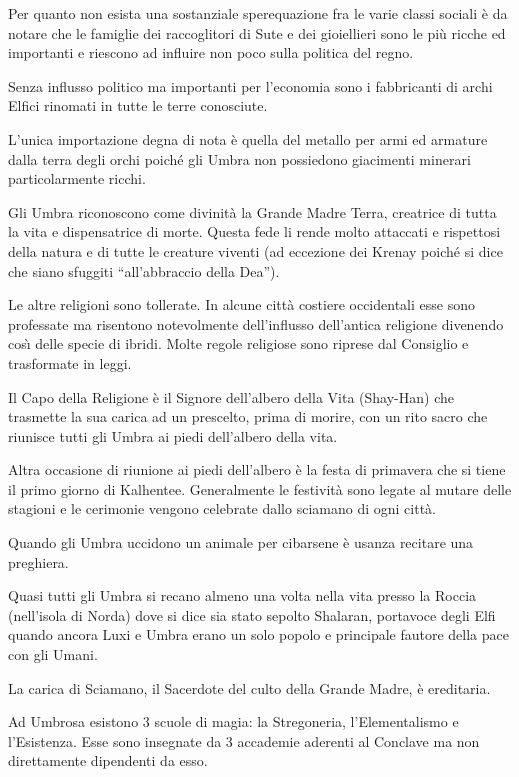 Per quanto non esista una sostanziale sperequazione fra le varie
classi sociali \`e da notare che le famiglie dei raccoglitori di Sute
e dei gioiellieri sono le pi\`u ricche ed importanti e riescono ad
influire non poco sulla politica del regno.

Senza influsso politico ma importanti per l'economia sono i
fabbricanti di archi Elfici rinomati in tutte le terre conosciute.

L'unica importazione degna di nota \`e quella del metallo per armi ed
armature dalla terra degli orchi poich\'e gli Umbra non possiedono
giacimenti minerari particolarmente ricchi.

\Religione Gli Umbra riconoscono come divinit\`a la Grande Madre
Terra, creatrice di tutta la vita e dispensatrice di morte. Questa
fede li rende molto attaccati e rispettosi della natura e di tutte le
creature viventi (ad eccezione dei Krenay poich\'e si dice che siano
sfuggiti ``all'abbraccio della Dea'').

Le altre religioni sono tollerate. In alcune citt\`a costiere
occidentali esse sono professate ma risentono notevolmente dell'influsso
dell'antica religione divenendo cos\`{\i} delle specie di ibridi. Molte
regole religiose sono riprese dal Consiglio e trasformate in leggi.


Il Capo della Religione \`e il Signore dell'albero della Vita
(Shay-Han) che trasmette la sua carica ad un prescelto, prima di
morire, con un rito sacro che riunisce tutti gli Umbra ai piedi
dell'albero della vita.

Altra occasione di riunione ai piedi dell'albero \`e la festa di
primavera che si tiene il primo giorno di Kalhentee. Generalmente le
festivit\`a sono legate al mutare delle stagioni e le cerimonie
vengono celebrate dallo sciamano di ogni citt\`a.

Quando gli Umbra uccidono un animale per cibarsene \`e usanza recitare
una preghiera.

Quasi tutti gli Umbra si recano almeno una volta nella vita presso la
Roccia (nell'isola di Norda) dove si dice sia stato sepolto Shalaran,
portavoce degli Elfi quando ancora Luxi e Umbra erano un solo popolo
e principale fautore della pace con gli Umani.  

La carica di Sciamano, il Sacerdote del culto della Grande Madre, \`e
ereditaria.

\Magia Ad Umbrosa esistono 3 scuole di magia: la Stregoneria,
l'Elementalismo e l'Esistenza. Esse sono insegnate da 3 accademie
aderenti al Conclave ma non direttamente dipendenti da esso.

